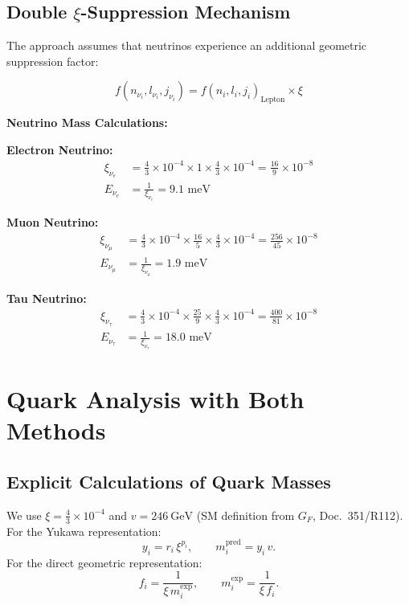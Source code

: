 	\subsection{Double $\xi$-Suppression Mechanism}
	\label{subsec:double_xi_suppression}
	
	The approach assumes that neutrinos experience an additional geometric suppression factor:
	
	\begin{equation}
		f(n_{\nu_i}, l_{\nu_i}, j_{\nu_i}) = f(n_i, l_i, j_i)_{\text{Lepton}} \times \xi
		\label{eq:neutrino_suppression}
	\end{equation}
	
	\textbf{Neutrino Mass Calculations:}
	
	\textbf{Electron Neutrino:}
	\begin{align}
		\xi_{\nu_e} &= \frac{4}{3} \times 10^{-4} \times 1 \times \frac{4}{3} \times 10^{-4} = \frac{16}{9} \times 10^{-8} \\
		E_{\nu_e} &= \frac{1}{\xi_{\nu_e}} = 9.1 \text{ meV}
	\end{align}
	
	\textbf{Muon Neutrino:}
	\begin{align}
		\xi_{\nu_\mu} &= \frac{4}{3} \times 10^{-4} \times \frac{16}{5} \times \frac{4}{3} \times 10^{-4} = \frac{256}{45} \times 10^{-8} \\
		E_{\nu_\mu} &= \frac{1}{\xi_{\nu_\mu}} = 1.9 \text{ meV}
	\end{align}
	
	\textbf{Tau Neutrino:}
	\begin{align}
		\xi_{\nu_\tau} &= \frac{4}{3} \times 10^{-4} \times \frac{25}{9} \times \frac{4}{3} \times 10^{-4} = \frac{400}{81} \times 10^{-8} \\
		E_{\nu_\tau} &= \frac{1}{\xi_{\nu_\tau}} = 18.0 \text{ meV}
	\end{align}
	
	\section{Quark Analysis with Both Methods}
	\label{sec:quark_analysis}
	
	\subsection{Explicit Calculations of Quark Masses}
	\label{subsec:quark_calculations}
	
	We use $\xi=\tfrac{4}{3}\times10^{-4}$ and $v=246\ \mathrm{GeV}$ (SM definition from $G_F$, Doc.~351/R112).
	For the Yukawa representation:
	\[
	y_i = r_i\,\xi^{p_i},\qquad m_i^{\text{pred}}=y_i\,v.
	\]
	For the direct geometric representation:
	\[
	f_i=\frac{1}{\xi\, m_i^{\text{exp}}},\qquad m_i^{\text{exp}}=\frac{1}{\xi\, f_i}.
	\]
	
